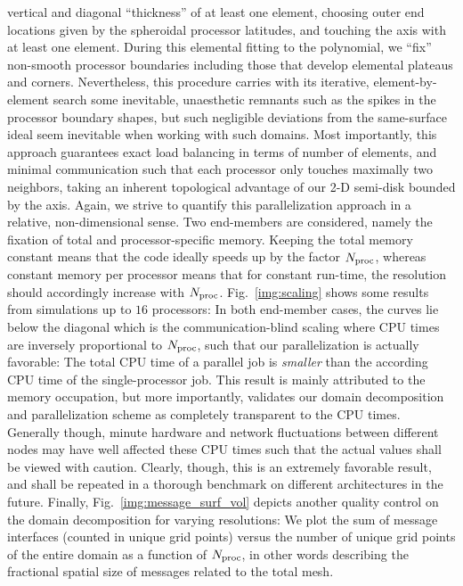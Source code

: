 \documentclass[11pt,letter,fleqn,english,notitlepage]{article}
\begin{document}
vertical and diagonal ``thickness'' of at least one element,
choosing outer end locations given by the 
spheroidal processor latitudes, and touching the axis with at least one 
element. During this elemental fitting to the polynomial, 
we ``fix'' non-smooth processor boundaries including those that 
develop elemental plateaus and corners.
%
Nevertheless, this procedure carries with its iterative, element-by-element 
search some inevitable, unaesthetic remnants such as the spikes in the processor 
boundary shapes, but such negligible deviations from the same-surface ideal 
seem inevitable when working with such domains.  
Most importantly, this approach guarantees exact load balancing in terms of 
number of elements, and minimal communication such that each processor only 
touches maximally two neighbors, taking an inherent topological 
advantage of our 2-D semi-disk bounded by the axis. 
%
%
Again, we strive to quantify this parallelization approach in a 
relative, non-dimensional sense. Two end-members are considered, 
namely the fixation of total and processor-specific memory. 
Keeping the total memory constant means that the code ideally speeds up 
by the factor $N_{\rm proc}$, whereas constant memory per processor means 
that for constant run-time, the resolution should accordingly 
increase with $N_{\rm proc}$. Fig.~\ref{img:scaling} shows some results from 
simulations up to $16$ processors: In both end-member cases, the curves lie 
below the diagonal which is the communication-blind scaling where CPU times 
are inversely proportional to $N_{\rm proc}$, such that our parallelization is 
actually favorable: The total CPU time of a parallel job is \textit{smaller} than 
the according CPU time of the single-processor job. This result is mainly attributed 
to the memory occupation, but more importantly, validates our domain decomposition 
and parallelization scheme as completely transparent to the CPU times. Generally though, 
minute hardware and network fluctuations between different nodes may have well affected
these CPU times such that the actual values shall be viewed with caution. Clearly, though, 
this is an extremely favorable result, and shall be repeated in a thorough benchmark 
on different architectures in the future.  
%
Finally, Fig.~\ref{img:message_surf_vol} depicts another quality control on the
domain decomposition for varying resolutions: We plot the sum of message
interfaces (counted in unique grid points) versus the number of unique grid
points of the entire domain as a function of $N_{\rm proc}$, in other
words describing the fractional spatial size of messages related to the total mesh. 
\end{document}
